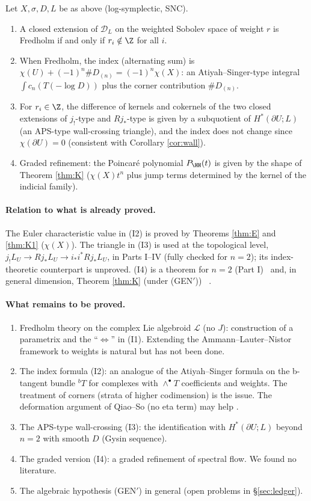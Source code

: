 \begin{conj}\label{conj:index}
Let $X,\sigma,D,L$ be as above (log-symplectic, SNC).
\begin{enumerate}
\item[(I1)] A closed extension of $\mathcal D_L$ on the weighted Sobolev space of weight $r$ is Fredholm if and only if $r_i\notin\Z$ for all $i$.
\item[(I2)] When Fredholm, the index (alternating sum) is $\chi(U)+(-1)^n\#D_{(n)}=(-1)^n\chi(X)$: an Atiyah--Singer-type integral $\int c_n(T(-\log D))$ plus the corner contribution $\#D_{(n)}$.
\item[(I3)] For $r_i\in\Z$, the difference of kernels and cokernels of the two closed extensions of $j_!$-type and $Rj_*$-type is given by a subquotient of $H^*(\partial U;L)$ (an APS-type wall-crossing triangle), and the index does not change since $\chi(\partial U)=0$ (consistent with Corollary \ref{cor:wall}).
\item[(I4)] Graded refinement: the Poincar\'e polynomial $P_{\HH}(t)$ is given by the shape of Theorem \ref{thm:K} ($\chi(X)t^n$ plus jump terms determined by the kernel of the indicial family).
\end{enumerate}
\end{conj}
\paragraph{Relation to what is already proved.} The Euler characteristic value in (I2) is proved by Theorems \ref{thm:E} and \ref{thm:K1} ($\chi(X)$). The triangle in (I3) is used at the topological level, $j_!L_U\to Rj_*L_U\to i_*i^*Rj_*L_U$, in Parts I--IV (fully checked for $n=2$); its index-theoretic counterpart is unproved. (I4) is a theorem for $n=2$ (Part I) \tP\ and, in general dimension, Theorem \ref{thm:K} (under (GEN$'$)) \tP\ \tQ.

\paragraph{What remains to be proved.}
\begin{enumerate}
\item Fredholm theory on the complex Lie algebroid $\mathcal L$ (no $J$): construction of a parametrix and the ``$\Leftrightarrow$'' in (I1). Extending the Ammann--Lauter--Nistor framework to weights is natural but has not been done.
\item The index formula (I2): an analogue of the Atiyah--Singer formula on the b-tangent bundle $^bT$ \cite{BLS} for complexes with $\wedge^\bullet T$ coefficients and weights. The treatment of corners (strata of higher codimension) is the issue. The deformation argument of Qiao--So (no eta term) may help \tQ.
\item The APS-type wall-crossing (I3): the identification with $H^*(\partial U;L)$ beyond $n=2$ with smooth $D$ (Gysin sequence).
\item The graded version (I4): a graded refinement of spectral flow. We found no literature.
\item The algebraic hypothesis (GEN$'$) in general (open problems in \S\ref{sec:ledger}).
\end{enumerate}

